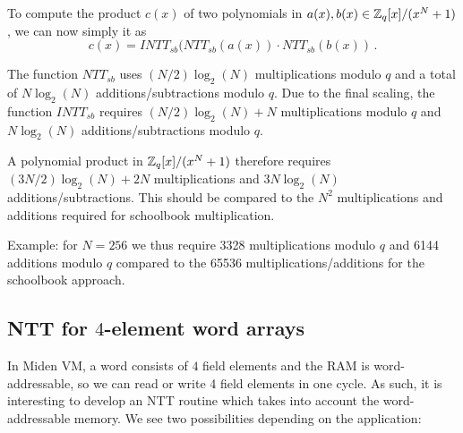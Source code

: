 \begin{algorithm}[!t] \label{algo:intt_sb}
\begin{scriptsize}
\caption{\emph{$INTT_{sb}$}}
\end{scriptsize}
\end{algorithm} 

To compute the product $c(x)$ of two polynomials in $a(x), b(x) \in \mathbb{Z}_q[x]/(x^N+1)$, we can now simply it as 
\[  c(x) = INTT_{sb}(NTT_{sb}(a(x)) \cdot NTT_{sb}(b(x)) \, . \]

The function $NTT_{sb}$ uses $(N/2) \log_2(N)$ multiplications modulo $q$ and a total of $N \log_2(N)$ additions/subtractions modulo $q$.
Due to the final scaling, the function $INTT_{sb}$ requires $(N/2) \log_2(N) + N$ multiplications modulo $q$ and 
$N \log_2(N)$ additions/subtractions modulo $q$.

A polynomial product in $\mathbb{Z}_q[x]/(x^N+1)$ therefore requires $(3N/2) \log_2(N) + 2N$ multiplications and $3 N \log_2(N)$ 
additions/subtractions.  This should be compared to the $N^2$ multiplications and additions required for schoolbook multiplication.

Example: for $N = 256$ we thus require 3328 multiplications modulo $q$ and 6144 additions modulo $q$ compared to the 
65536 multiplications/additions for the schoolbook approach.

\subsection{NTT for $4$-element word arrays}

In Miden VM, a word consists of $4$ field elements and the RAM is word-addressable, so we can read or write 4 field
elements in one cycle.  As such, it is interesting to develop an NTT routine which takes into account the word-addressable
memory.   We see two possibilities depending on the application:

